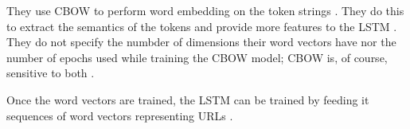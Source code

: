 They use CBOW to perform word embedding on the token strings \cite{fang2018deepxss}. They do this to extract the semantics of the tokens and provide more features to the LSTM \cite{fang2018deepxss}. They do not specify the numbder of dimensions their word vectors have nor the number of epochs used while training the CBOW model; CBOW is, of course, sensitive to both \cite{mikolov2013efficient}.

Once the word vectors are trained, the LSTM can be trained by feeding it sequences of word vectors representing URLs \cite{fang2018deepxss}. 